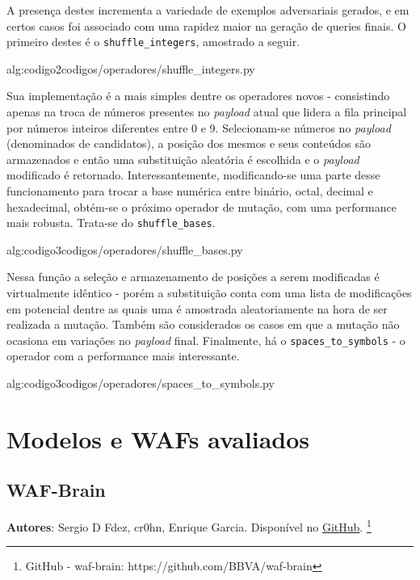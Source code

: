 A presença destes incrementa a variedade de exemplos adversariais gerados, e em certos casos foi associado com uma rapidez maior na geração de queries finais. O primeiro destes é o \verb+shuffle_integers+, amostrado a seguir.

\label{sec:codigos}
 {alg:codigo2}{codigos/operadores/shuffle_integers.py}

\bigskip

Sua implementação é a mais simples dentre os operadores novos - consistindo apenas na troca de números presentes no \textit{payload} atual que lidera a fila principal por números inteiros diferentes entre 0 e 9. Selecionam-se números no \textit{payload} (denominados de candidatos), a posição dos mesmos e seus conteúdos são armazenados e então uma substituição aleatória é escolhida e o \textit{payload} modificado é retornado.  Interessantemente, modificando-se uma parte desse funcionamento para trocar a base numérica entre binário, octal, decimal e hexadecimal, obtém-se o próximo operador de mutação, com uma performance mais robusta. Trata-se do \verb+shuffle_bases+.

\label{sec:codigos}
 {alg:codigo3}{codigos/operadores/shuffle_bases.py}

\bigskip

Nessa função a seleção e armazenamento de posições a serem modificadas é virtualmente idêntico - porém a substituição conta com uma lista de modificações em potencial dentre as quais uma é amostrada aleatoriamente na hora de ser realizada a mutação. Também são considerados os casos em que a mutação não ocasiona em variações no \textit{payload} final. Finalmente, há o \verb+spaces_to_symbols+ - o operador com a performance mais interessante.

\label{sec:codigos}
 {alg:codigo3}{codigos/operadores/spaces_to_symbols.py}

\bigskip


\section{Modelos e WAFs avaliados}

\subsection{WAF-Brain}

\textbf{Autores}: Sergio D Fdez, cr0hn, Enrique Garcia. Disponível no \href{https://github.com/BBVA/waf-brain}{GitHub}. \footnote{GitHub - waf-brain: https://github.com/BBVA/waf-brain}

